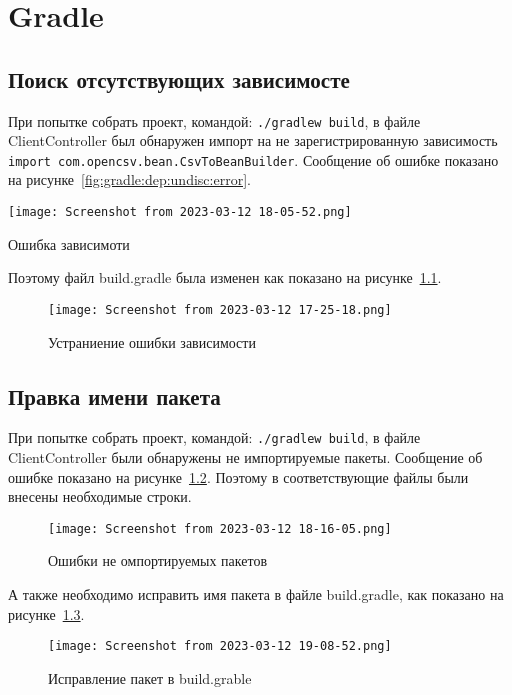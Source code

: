 \chapter{Gradle}
\section{Поиск отсутствующих зависимосте}
При попытке собрать проект, командой: \texttt{./gradlew~build},
в файле ClientController был обнаружен импорт на не зарегистрированную
зависимость \texttt{import~com.opencsv.bean.CsvToBeanBuilder}.
Сообщение об ошибке показано на рисунке~\ref{fig:gradle:dep:undisc:error}.

\begin{image}
	\texttt{[image: Screenshot from 2023-03-12 18-05-52.png]}
	\caption{Ошибка зависимоти}
	\label{fig:gradle:dep:undisc:error}
\end{image}

Поэтому файл build.gradle была изменен как показано
на рисунке~\ref{fig:gradle:dep:undisc:good}.

\begin{figure}[h!tp]
	\centering
	\texttt{[image: Screenshot from 2023-03-12 17-25-18.png]}
	\caption{Устраниение ошибки зависимости}
	\label{fig:gradle:dep:undisc:good}
\end{figure}

\section{Правка имени пакета}
При попытке собрать проект, командой: \texttt{./gradlew~build},
в файле ClientController были обнаружены не импортируемые пакеты.
Сообщение об ошибке показано на рисунке~\ref{fig:gradle:imp:error}.
Поэтому в соответствующие файлы были внесены необходимые строки.

\begin{figure}[h!tp]
	\centering
	\texttt{[image: Screenshot from 2023-03-12 18-16-05.png]}
	\caption{Ошибки не омпортируемых пакетов}
	\label{fig:gradle:imp:error}
\end{figure}

А также необходимо исправить имя пакета в файле build.gradle, как показано
на рисунке~\ref{fig:gradle:build:pack}.

\begin{figure}[h!tp]
	\centering
	\texttt{[image: Screenshot from 2023-03-12 19-08-52.png]}
	\caption{Исправление пакет в build.grable}
	\label{fig:gradle:build:pack}
\end{figure}
